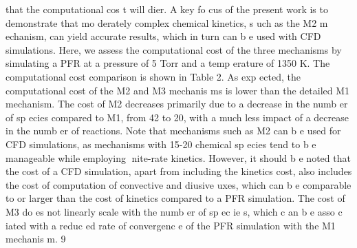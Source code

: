 \documentclass[10pt, letterpaper]{article}
\begin{document}
that the computational cos t will dier. A key fo cus of the present work is to demonstrate that mo derately
complex chemical kinetics, s uch as the M2 m echanism, can yield accurate results, which in turn can b e used
with CFD simulations. Here, we assess the computational cost of the three mechanisms by simulating a
PFR at a pressure of 5 Torr and a temp erature of 1350 K. The computational cost comparison is shown in
Table 2.
As exp ected, the computational cost of the M2 and M3 mechanis ms is lower than the detailed M1
mechanism. The cost of M2 decreases primarily due to a decrease in the numb er of sp ecies compared to M1,
from 42 to 20, with a much less impact of a decrease in the numb er of reactions. Note that mechanisms such
as M2 can b e used for CFD simulations, as mechanisms with 15-20 chemical sp ecies tend to b e manageable
while employing nite-rate kinetics. However, it should b e noted that the cost of a CFD simulation, apart
from including the kinetics cost, also includes the cost of computation of convective and diusive 
uxes,
which can b e comparable to or larger than the cost of kinetics compared to a PFR simulation. The cost
of M3 do es not linearly scale with the numb er of sp ec ie s, which c an b e asso c iated with a reduc ed rate of
convergenc e of the PFR simulation with the M1 mechanis m.
9
\end{document}
